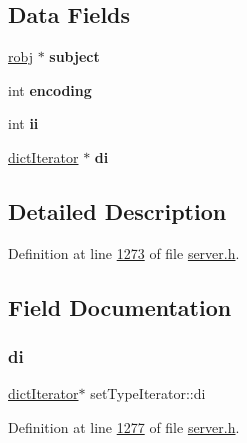 \subsection*{Data Fields}
\begin{DoxyCompactItemize}
\item 
\mbox{\label{structsetTypeIterator_affbd13bac6696496ab154e8c24fb3329}} 
\hyperlink{structredisObject}{robj} $\ast$ {\bfseries subject}
\item 
\mbox{\label{structsetTypeIterator_ac5fbe60f8e4e0e0a6c048267ea7182a4}} 
int {\bfseries encoding}
\item 
\mbox{\label{structsetTypeIterator_a44cea1256505ead86e65bf00a5d107d6}} 
int {\bfseries ii}
\item 
\mbox{\label{structsetTypeIterator_a9a857572cb10c142e9b1247e9f0ca11f}} 
\hyperlink{structdictIterator}{dict\+Iterator} $\ast$ {\bfseries di}
\end{DoxyCompactItemize}


\subsection{Detailed Description}


Definition at line \hyperlink{server_8h_source_l01273}{1273} of file \hyperlink{server_8h_source}{server.\+h}.



\subsection{Field Documentation}
\mbox{\label{structsetTypeIterator_a9a857572cb10c142e9b1247e9f0ca11f}} 
\subsubsection{\texorpdfstring{di}{di}}
{\footnotesize\ttfamily \hyperlink{structdictIterator}{dict\+Iterator}$\ast$ set\+Type\+Iterator\+::di}



Definition at line \hyperlink{server_8h_source_l01277}{1277} of file \hyperlink{server_8h_source}{server.\+h}.


